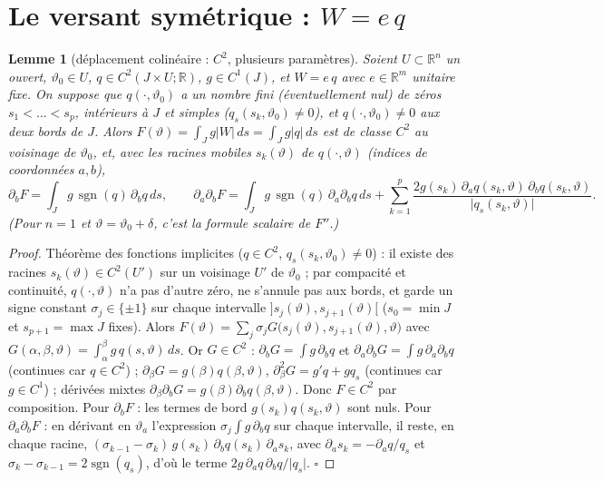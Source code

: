 \documentclass[11pt,a4paper]{article}
\newtheorem{lemme}[theoreme]{Lemme}
\theoremstyle{remark}
\newcommand{\R}{\mathbb R}
\newcommand{\vth}{\vartheta}
\newcommand{\dl}{\delta}
\begin{document}
\section{Le versant symétrique : $W=e\,q$}

\begin{lemme}[déplacement colinéaire : $C^2$, plusieurs paramètres]\label{lem:sym}
Soient $U\subset\R^n$ un ouvert, $\vth_0\in U$, $q\in C^2(J\times U;\R)$, $g\in C^1(J)$, et $W=e\,q$ avec $e\in\R^m$ unitaire fixe. On suppose que $q(\cdot,\vth_0)$ a un nombre fini (éventuellement nul) de zéros $s_1<\dots<s_p$, intérieurs à $J$ et simples ($q_s(s_k,\vth_0)\neq0$), et $q(\cdot,\vth_0)\neq0$ aux deux bords de $J$. Alors $F(\vth)=\int_Jg\lvert W\rvert\,ds=\int_Jg\lvert q\rvert\,ds$ est de classe $C^2$ au voisinage de $\vth_0$, et, avec les racines mobiles $s_k(\vth)$ de $q(\cdot,\vth)$ (indices de coordonnées $a,b$),
\[
\partial_bF=\int_Jg\,\operatorname{sgn}(q)\,\partial_bq\,ds,\qquad
\partial_a\partial_bF=\int_Jg\,\operatorname{sgn}(q)\,\partial_a\partial_bq\,ds+\sum_{k=1}^p\frac{2g(s_k)\,\partial_aq(s_k,\vth)\,\partial_bq(s_k,\vth)}{\lvert q_s(s_k,\vth)\rvert}.
\]
(Pour $n=1$ et $\vth=\vth_0+\dl$, c'est la formule scalaire de $F''$.)
\end{lemme}
\begin{proof}
Théorème des fonctions implicites ($q\in C^2$, $q_s(s_k,\vth_0)\ne0$) : il existe des racines $s_k(\vth)\in C^2(U')$ sur un voisinage $U'$ de $\vth_0$ ; par compacité et continuité, $q(\cdot,\vth)$ n'a pas d'autre zéro, ne s'annule pas aux bords, et garde un signe constant $\sigma_j\in\{\pm1\}$ sur chaque intervalle $]s_j(\vth),s_{j+1}(\vth)[$ ($s_0=\min J$ et $s_{p+1}=\max J$ fixes). Alors $F(\vth)=\sum_j\sigma_jG\bigl(s_j(\vth),s_{j+1}(\vth),\vth\bigr)$ avec $G(\alpha,\beta,\vth)=\int_\alpha^\beta g\,q(s,\vth)\,ds$. Or $G\in C^2$ : $\partial_bG=\int g\,\partial_bq$ et $\partial_a\partial_bG=\int g\,\partial_a\partial_bq$ (continues car $q\in C^2$) ; $\partial_\beta G=g(\beta)q(\beta,\vth)$, $\partial_\beta^2G=g'q+gq_s$ (continues car $g\in C^1$) ; dérivées mixtes $\partial_\beta\partial_bG=g(\beta)\partial_bq(\beta,\vth)$. Donc $F\in C^2$ par composition. Pour $\partial_bF$ : les termes de bord $g(s_k)q(s_k,\vth)$ sont nuls. Pour $\partial_a\partial_bF$ : en dérivant en $\vth_a$ l'expression $\sigma_j\int g\,\partial_bq$ sur chaque intervalle, il reste, en chaque racine, $(\sigma_{k-1}-\sigma_k)\,g(s_k)\,\partial_bq(s_k)\,\partial_as_k$, avec $\partial_as_k=-\partial_aq/q_s$ et $\sigma_k-\sigma_{k-1}=2\operatorname{sgn}(q_s)$, d'où le terme $2g\,\partial_aq\,\partial_bq/\lvert q_s\rvert$. $\square$
\end{proof}
\end{document}
